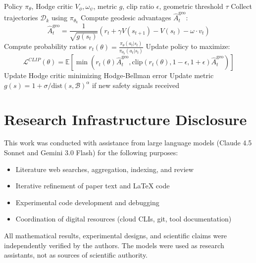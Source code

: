 \begin{algorithm}[H]
\caption{Clipped Sheaf-Geodesic Policy Optimization}
\begin{algorithmic}[1]
\REQUIRE Policy $\pi_\theta$, Hodge critic $V_\phi, \omega_\psi$, metric $g$, clip ratio $\epsilon$, geometric threshold $\tau$
    \STATE Collect trajectories $\mathcal{D}_k$ using $\pi_{\theta_k}$
    \STATE Compute geodesic advantages $\hat{A}_t^{\text{geo}}$:
    \[
    \hat{A}_t^{\text{geo}} = \frac{1}{\sqrt{g(s_t)}} \left( r_t + \gamma V(s_{t+1}) - V(s_t) - \omega \cdot v_t \right)
    \]
    \STATE Compute probability ratios $r_t(\theta) = \frac{\pi_\theta(a_t|s_t)}{\pi_{\theta_k}(a_t|s_t)}$
    \STATE Update policy to maximize:
    \[
    \mathcal{L}^{CLIP}(\theta) = \mathbb{E}\left[\min\left(r_t(\theta)\hat{A}_t^{\text{geo}}, \text{clip}(r_t(\theta), 1-\epsilon, 1+\epsilon)\hat{A}_t^{\text{geo}}\right)\right]
    \]
    \STATE Update Hodge critic minimizing Hodge-Bellman error
    \STATE Update metric $g(s) = 1 + \sigma / \text{dist}(s, \mathcal{B})^\alpha$ if new safety signals received
\ENDFOR
\end{algorithmic}
\end{algorithm}

\section{Research Infrastructure Disclosure}
\label{app:disclosure}

This work was conducted with assistance from large language models (Claude 4.5 Sonnet and Gemini 3.0 Flash) for the following purposes:
\begin{itemize}
    \item Literature web searches, aggregation, indexing, and review
    \item Iterative refinement of paper text and LaTeX code
    \item Experimental code development and debugging
    \item Coordination of digital resources (cloud CLIs, git, tool documentation)
\end{itemize}

All mathematical results, experimental designs, and scientific claims were independently verified by the authors. The models were used as research assistants, not as sources of scientific authority.

